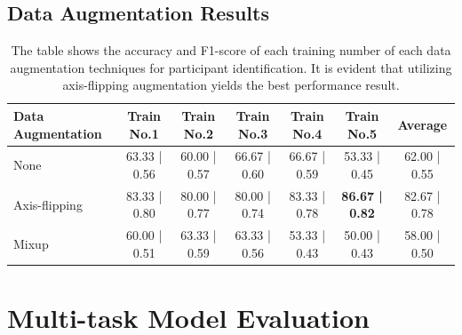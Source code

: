 \documentclass{l4proj}
\begin{document}
\begin{appendices}
\subsection{Data Augmentation Results}
\begin{table}[ht]
    \centering
    \begin{tabular}{|l|c|c|c|c|c|c|}
        \hline
        \rowcolor{lightgray}
        \textbf{Data Augmentation} & \textbf{Train No.1} & \textbf{Train No.2} & \textbf{Train No.3} & \textbf{Train No.4} & \textbf{Train No.5} & \textbf{Average} \\
        \hline
        None & 63.33 | 0.56 & 60.00 | 0.57 & 66.67 | 0.60 & 66.67 | 0.59 & 53.33 | 0.45 & 62.00 | 0.55 \\
        \hline
        Axis-flipping & 83.33 | 0.80 & 80.00 | 0.77 & 80.00 | 0.74 & 83.33 | 0.78 & \textbf{86.67 | 0.82} & 82.67 | 0.78 \\
        \hline
        Mixup & 60.00 | 0.51 & 63.33 | 0.59 & 63.33 | 0.56 & 53.33 | 0.43 & 50.00 | 0.43 & 58.00 | 0.50 \\
        \hline
    \end{tabular}
    \caption{The table shows the accuracy and F1-score of each training number of each data augmentation techniques for participant identification. It is evident that utilizing axis-flipping augmentation yields the best performance result.}
    \label{tab:participant-recognition-data-augmentations-evaluation}
\end{table}

\newpage

\section{Multi-task Model Evaluation}

\end{appendices}
\end{document}
